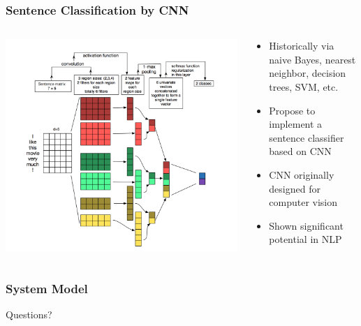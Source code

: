 \documentclass{beamer}
\begin{document}
\begin{frame}
\frametitle{Sentence Classification by CNN}
        \begin{columns}
    \begin{column}{0.5\textwidth}
    \center\includegraphics[width=\textwidth]{figure/sc_cnn}
    \end{column}
    \begin{column}{0.5\textwidth}
    \begin{itemize}
        \item Historically via naive Bayes, nearest neighbor, decision trees, SVM, etc.
        \item Propose to implement a sentence classifier based on CNN
        \item CNN originally designed for computer vision
        \item Shown significant potential in NLP
    \end{itemize}
    \end{column}
    \end{columns}
\end{frame}

\begin{frame}
\frametitle{System Model}
    
\end{frame}

\begin{frame}
\center Questions?
\end{frame}
\end{document}
